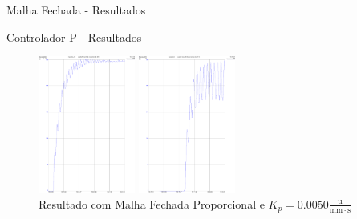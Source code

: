 \documentclass[10pt]{beamer}
\begin{document}
\begin{frame}[fragile]{Malha Fechada - Resultados}
\begin{block}{Controlador P - Resultados}
\begin{figure}[!htb]
    \centering
    \begin{minipage}{.45\textwidth}
        \centering
        \includegraphics[width=1\linewidth,height=4.5cm]{figures/resultados/malha_fechada_P/MF_Proporcional_Kp_00025.pdf}
        \caption{Resultado com Malha Fechada Proporcional e $K_p = 0.0025\frac{\mathrm{u}}{\mathrm{mm}\cdot\mathrm{s}}$}
        \label{MFProporcionalKpbaixo}
    \end{minipage}%
    \hspace{0.1cm}
    \begin{minipage}{0.45\textwidth}
        \centering
        \includegraphics[width=1\linewidth,height=4.5cm]{figures/resultados/malha_fechada_P/MF_Proporcional_Kp_00050.pdf}
        \caption{Resultado com Malha Fechada Proporcional e $K_p = 0.0050\frac{\mathrm{u}}{\mathrm{mm}\cdot\mathrm{s}}$
        \label{MFProporcionalKpmedio}}
    \end{minipage}
\end{figure}
\end{block}
\end{frame}
\end{document}

